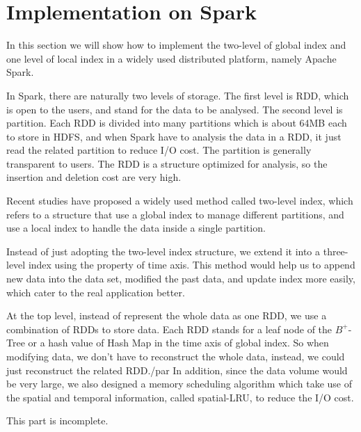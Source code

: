 \documentclass[sigplan]{acmart}
\begin{document}
\section{Implementation on Spark}
In this section we will show how to implement the two-level of global index and one level of local index in a widely used distributed platform, namely Apache Spark.\par
In Spark, there are naturally two levels of storage. The first level is RDD, which is open to the users, and stand for the data to be analysed. The second level is partition. Each RDD is divided into many partitions which is about 64MB each to store in HDFS, and when Spark have to analysis the data in a RDD, it just read the related partition to reduce I/O cost. The partition is generally transparent to users. The RDD is a structure optimized for analysis, so the insertion and deletion cost are very high.\par
Recent studies have proposed a widely used method called two-level index, which refers to a structure that use a global index to manage different partitions, and use a local index to handle the data inside a single partition. \par
Instead of just adopting the two-level index structure, we extend it into a three-level index using the property of time axis. This method would help us to append new data into the data set, modified the past data, and update index more easily, which cater to the real application better.\par
At the top level, instead of represent the whole data as one RDD, we use a combination of RDDs to store data. Each RDD stands for a leaf node of the $B^+$-Tree or a hash value of Hash Map in the time axis of global index. So when modifying data, we don't have to reconstruct the whole data, instead, we could just reconstruct the related RDD./par
In addition, since the data volume would be very large, we also designed a memory scheduling algorithm which take use of the spatial and temporal information, called spatial-LRU, to reduce the I/O cost.\par

This part is incomplete.




\end{document}
